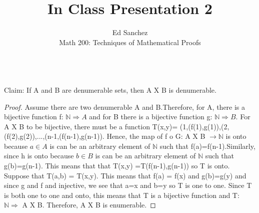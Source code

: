\documentclass[12pt]{article}
\newenvironment{problem}[2][Problem]{\begin{trivlist}
\item[\hskip \labelsep {\bfseries #1}\hskip \labelsep {\bfseries #2.}]}{\end{trivlist}}
\begin{document}
 
\title{In Class Presentation 2}
\author{Ed Sanchez\\ 
Math 200: Techniques of Mathematical Proofs}
 
\maketitle
 
\begin{problem}{Deumurability}
\text{ }\\
Claim: If A and B are denumerable sets, then A X B is denumerable. 
\end{problem}
\begin{proof}
Assume there are two denumerable A and B.Therefore, for A, there is a bijective function f: $\mathbb{N} \Rightarrow A$ and for B there is a bijective function g: $\mathbb{N} \Rightarrow B$. For A X B to be bijective, there must be a function T(x,y)= {(1,(f(1),g(1)),(2,(f(2),g(2)),...,(n-1,(f(n-1),g(n-1))}. Hence, the map of f o G: A X B $\rightarrow \mathbb{N}$ is onto because $a\in A$ is can be an arbitrary element of $\mathbb{N}$ such that f(a)=f(n-1).Similarly, since h is onto because $b\in B$ is can be an arbitrary element of $\mathbb{N}$ such that g(b)=g(n-1). This means that that T(x,y) =T(f(n-1),g(n-1)) so T is onto. Suppose that T(a,b) = T(x,y). This means that f(a) = f(x) and g(b)=g(y) and since g and f and injective, we see that a=x and b=y so T is one to one. Since T is both one to one and onto, this means that T is a bijective function and T: $\mathbb{N} \Rightarrow$ A X B. Therefore, A X B is enumerable.
 
\end{proof}
 
\end{document}
